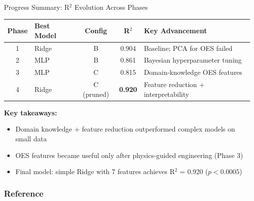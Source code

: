 \documentclass{libs/XJTLU_format}
\begin{document}
\begin{frame}{Progress Summary: R$^2$ Evolution Across Phases}
    \begin{table}[h]
        \centering
        \begin{tabular}{@{}clccp{4.5cm}@{}}
            \toprule
            \textbf{Phase} & \textbf{Best Model} & \textbf{Config} & \textbf{R$^2$} & \textbf{Key Advancement} \\
            \midrule
            1 & Ridge & B & 0.904 & Baseline; PCA for OES failed \\
            2 & MLP   & B & 0.861 & Bayesian hyperparameter tuning \\
            3 & MLP   & C & 0.815 & Domain-knowledge OES features \\
            4 & Ridge & C (pruned) & \textbf{0.920} & Feature reduction + interpretability \\
            \bottomrule
        \end{tabular}
    \end{table}
    \vspace{0.5em}
    \textbf{Key takeaways:}
    \begin{itemize}
        \item Domain knowledge + feature reduction outperformed complex models on small data
        \item OES features became useful only after physics-guided engineering (Phase 3)
        \item Final model: simple Ridge with 7 features achieves R$^2$ = 0.920 ($p < 0.0005$)
    \end{itemize}
\end{frame}


\begin{frame}[allowframebreaks]
    \frametitle{Reference}
        \tiny\printbibliography
\end{frame}

\begin{frame}{}
    \centering
    \huge{\textbf{}}


\end{frame}
\end{document}
